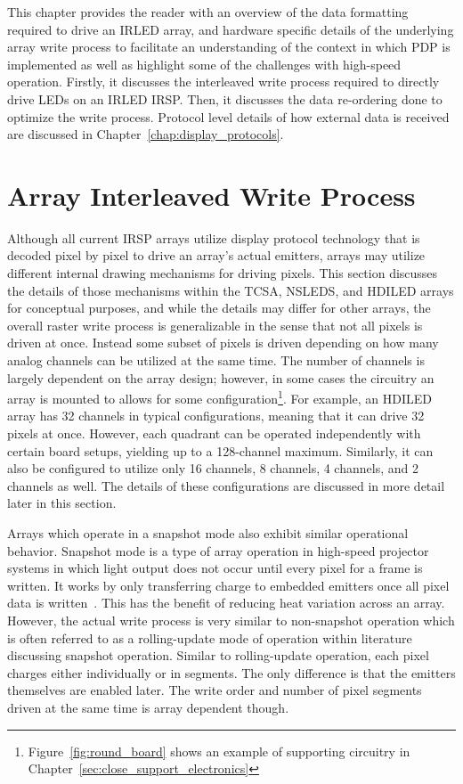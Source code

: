 \label{chap:array_write_process}
This chapter provides the reader with an overview of the data formatting required to drive an IRLED array, and hardware specific details of the underlying array write process to facilitate an understanding of the context in which PDP is implemented as well as highlight some of the challenges with high-speed operation. Firstly, it discusses the interleaved write process required to directly drive LEDs on an IRLED IRSP. Then, it discusses the data re-ordering done to optimize the write process. Protocol level details of how external data is received are discussed in Chapter~\ref{chap:display_protocols}.


\section{Array Interleaved Write Process}
    \label{sec:array_Interleaved_write_process}
    Although all current IRSP arrays utilize display protocol technology that is decoded pixel by pixel to drive an array's actual emitters, arrays may utilize different internal drawing mechanisms for driving pixels. This section discusses the details of those mechanisms within the TCSA, NSLEDS, and HDILED arrays for conceptual purposes, and while the details may differ for other arrays, the overall raster write process is generalizable in the sense that not all pixels is driven at once. Instead some subset of pixels is driven depending on how many analog channels can be utilized at the same time. The number of channels is largely dependent on the array design; however, in some cases the circuitry an array is mounted to allows for some configuration\footnote{Figure~\ref{fig:round_board} shows an example of supporting circuitry in Chapter~\ref{sec:close_support_electronics}}. For example, an HDILED array has 32 channels in typical configurations, meaning that it can drive 32 pixels at once. However, each quadrant can be operated independently with certain board setups, yielding up to a 128-channel maximum. Similarly, it can also be configured to utilize only 16 channels, 8 channels, 4 channels, and 2 channels as well. The details of these configurations are discussed in more detail later in this section.

    Arrays which operate in a snapshot mode also exhibit similar operational behavior. Snapshot mode is a type of array operation in high-speed projector systems in which light output does not occur until every pixel for a frame is written. It works by only transferring charge to embedded emitters once all pixel data is written~\cite{McHughEtAl1999}. This has the benefit of reducing heat variation across an array. However, the actual write process is very similar to non-snapshot operation which is often referred to as a rolling-update mode of operation within literature discussing snapshot operation. Similar to rolling-update operation, each pixel charges either individually or in segments. The only difference is that the emitters themselves are enabled later. The write order and number of pixel segments driven at the same time is array dependent though.


